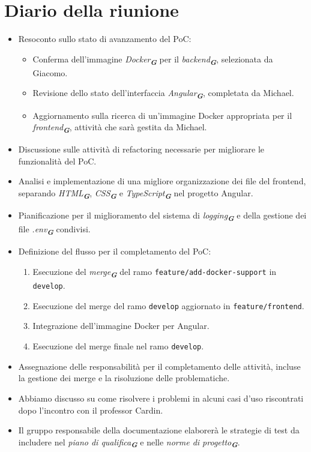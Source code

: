 
\section{Diario della riunione}

\begin{itemize}
    \item Resoconto sullo stato di avanzamento del PoC:
    \begin{itemize}
        \item Conferma dell'immagine \emph{Docker}\textsubscript{\textit{\textbf{G}}} per il \emph{backend}\textsubscript{\textit{\textbf{G}}}, selezionata da Giacomo.
        \item Revisione dello stato dell'interfaccia \emph{Angular}\textsubscript{\textit{\textbf{G}}}, completata da Michael.
        \item Aggiornamento sulla ricerca di un'immagine Docker appropriata per il \emph{frontend}\textsubscript{\textit{\textbf{G}}}, attività che sarà gestita da Michael.
    \end{itemize}
    \item Discussione sulle attività di refactoring necessarie per migliorare le funzionalità del PoC.
    \item Analisi e implementazione di una migliore organizzazione dei file del frontend, separando \emph{HTML}\textsubscript{\textit{\textbf{G}}}, \emph{CSS}\textsubscript{\textit{\textbf{G}}} e \emph{TypeScript}\textsubscript{\textit{\textbf{G}}} nel progetto Angular.
    \item Pianificazione per il miglioramento del sistema di \emph{logging}\textsubscript{\textit{\textbf{G}}} e della gestione dei file \emph{.env}\textsubscript{\textit{\textbf{G}}} condivisi.
    \item Definizione del flusso per il completamento del PoC:
    \begin{enumerate}
        \item Esecuzione del \emph{merge}\textsubscript{\textit{\textbf{G}}} del ramo \texttt{feature/add-docker-support} in \texttt{develop}.
        \item Esecuzione del merge del ramo \texttt{develop} aggiornato in \texttt{feature/frontend}.
        \item Integrazione dell'immagine Docker per Angular.
        \item Esecuzione del merge finale nel ramo \texttt{develop}.
    \end{enumerate}
    \item Assegnazione delle responsabilità per il completamento delle attività, incluse la gestione dei merge e la risoluzione delle problematiche.
    \item Abbiamo discusso su come risolvere i problemi in alcuni casi d'uso riscontrati dopo l'incontro con il professor Cardin.
    \item Il gruppo responsabile della documentazione elaborerà le strategie di test da includere nel \emph{piano di qualifica}\textsubscript{\textit{\textbf{G}}} e nelle \emph{norme di progetto}\textsubscript{\textit{\textbf{G}}}.
\end{itemize}
